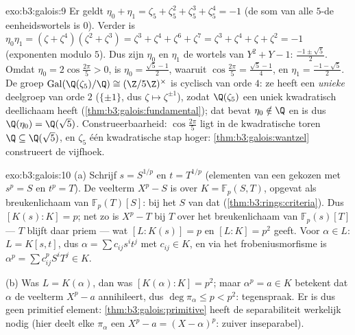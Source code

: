 \begin{solution}{exo:b3:galois:9}
Er geldt $\eta_0 + \eta_1 = \zeta_5 + \zeta_5^2 + \zeta_5^3 +
\zeta_5^4 = -1$ (de som van alle $5$-de eenheidswortels is $0$).
Verder is $\eta_0\eta_1 = (\zeta + \zeta^4)(\zeta^2 + \zeta^3) =
\zeta^3 + \zeta^4 + \zeta^6 + \zeta^7 = \zeta^3 + \zeta^4 + \zeta
+ \zeta^2 = -1$ (exponenten modulo $5$). Dus zijn $\eta_0$ en
$\eta_1$ de wortels van $Y^2 + Y - 1$: $\frac{-1 \pm \sqrt5}2$.
Omdat $\eta_0 = 2\cos\frac{2\pi}5 > 0$, is $\eta_0 = \frac{\sqrt5
- 1}2$, waaruit $\cos\frac{2\pi}5 = \frac{\sqrt5 - 1}4$, en
$\eta_1 = \frac{-1-\sqrt5}2$. De groep
$\operatorname{Gal}(\Q(\zeta_5)/\Q) \cong (\Z/5\Z)^\times$ is
cyclisch van orde $4$: ze heeft een \emph{unieke} deelgroep van
orde $2$ ($\{\pm 1\}$, dus $\zeta \mapsto \zeta^{\pm1}$), zodat
$\Q(\zeta_5)$ een uniek kwadratisch deellichaam heeft
(\cref{thm:b3:galois:fundamental}); dat bevat $\eta_0 \notin \Q$
en is dus $\Q(\eta_0) = \Q(\sqrt5)$. Construeerbaarheid:
$\cos\frac{2\pi}5$ ligt in de kwadratische toren $\Q \subseteq
\Q(\sqrt5)$, en $\zeta_5$ één kwadratische stap hoger:
\cref{thm:b3:galois:wantzel} construeert de vijfhoek.
\end{solution}

\begin{solution}{exo:b3:galois:10}
(a) Schrijf $s = S^{1/p}$ en $t = T^{1/p}$ (elementen van een
gekozen  met $s^p = S$ en $t^p = T$). De
veelterm $X^p - S$ is  over $K = \mathbb F_p(S, T)$,
opgevat als breukenlichaam van $\mathbb F_p(T)[S]$:  bij
het  $S$ van dat 
(\cref{thm:b3:rings:criteria}). Dus $[K(s):K] = p$; net zo is $X^p
- T$  bij $T$ over het breukenlichaam van $\mathbb
F_p(s)[T]$ --- $T$ blijft daar priem --- wat $[L : K(s)] = p$ en
$[L:K] = p^2$ geeft. Voor $\alpha \in L$: $L = K[s, t]$, dus
$\alpha = \sum c_{ij}s^it^j$ met $c_{ij} \in K$, en via het
frobeniusmorfisme is $\alpha^p = \sum c_{ij}^p S^iT^j \in K$.

(b) Was $L = K(\alpha)$, dan was $[K(\alpha):K] = p^2$; maar
$\alpha^p = a \in K$ betekent dat $\alpha$ de veelterm $X^p - a$
annihileert, dus $\deg\pi_\alpha \leq p < p^2$: tegenspraak. Er is
dus geen primitief element: \cref{thm:b3:galois:primitive} heeft
de separabiliteit werkelijk nodig (hier deelt elke $\pi_\alpha$
een $X^p - a = (X - \alpha)^p$: zuiver inseparabel).
\end{solution}

